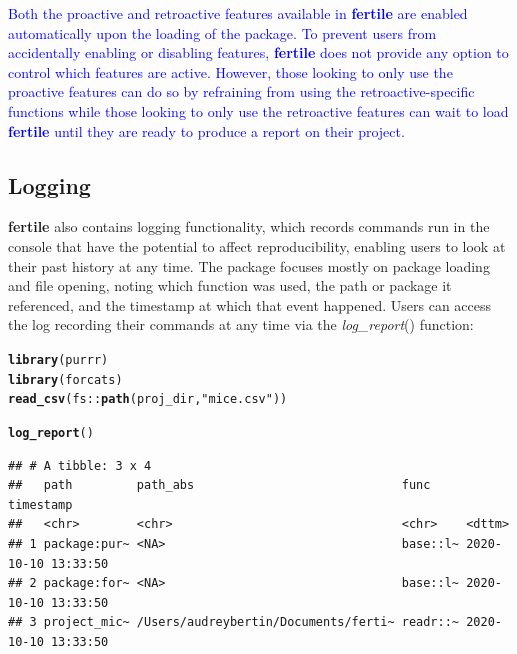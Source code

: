 \documentclass[APA,LATO1COL]{WileyNJD-v2}\usepackage[]{graphicx}\usepackage[]{color}
\makeatletter
\newcommand{\hlstr}[1]{\textcolor[rgb]{0.192,0.494,0.8}{#1}}%
\newcommand{\hlopt}[1]{\textcolor[rgb]{0,0,0}{#1}}%
\newcommand{\hlstd}[1]{\textcolor[rgb]{0.345,0.345,0.345}{#1}}%
\newcommand{\hlkwd}[1]{\textcolor[rgb]{0.737,0.353,0.396}{\textbf{#1}}}%
\newenvironment{kframe}{%
 \def\at@end@of@kframe{}%
 \ifinner\ifhmode%
  \def\at@end@of@kframe{\end{minipage}}%
  \begin{minipage}{\columnwidth}%
 \fi\fi%
 \def\FrameCommand##1{\hskip\@totalleftmargin \hskip-\fboxsep
 \colorbox{shadecolor}{##1}\hskip-\fboxsep
     \hskip-\linewidth \hskip-\@totalleftmargin \hskip\columnwidth}%
 \MakeFramed {\advance\hsize-\width
   \@totalleftmargin\z@ \linewidth\hsize
   \@setminipage}}%
 {\par\unskip\endMakeFramed%
 \at@end@of@kframe}
\newenvironment{knitrout}{}{} %
\newcommand{\pkg}[1]{\textbf{#1}}
\newcommand{\func}[1]{\textit{#1}()}
\makeatother
\begin{document}
\textcolor{blue}{Both the proactive and retroactive features available in \pkg{fertile} are enabled automatically upon the loading of the package. To prevent users from accidentally enabling or disabling features, \pkg{fertile} does not provide any option to control which features are active. However, those looking to only use the proactive features can do so by refraining from using the retroactive-specific functions while those looking to only use the retroactive features can wait to load \pkg{fertile} until they are ready to produce a report on their project.}

\subsection{Logging}

\pkg{fertile} also contains logging functionality, which records commands run in the console that have the potential to affect reproducibility, enabling users to look at their past history at any time. The package focuses mostly on package loading and file opening, noting which function was used, the path or package it referenced, and the timestamp at which that event happened. Users can access the log recording their commands at any time via the \func{log\_report} function:




\begin{knitrout}
\color{fgcolor}\begin{kframe}
\begin{alltt}
\hlkwd{library}\hlstd{(purrr)}
\hlkwd{library}\hlstd{(forcats)}
\hlkwd{read_csv}\hlstd{(fs}\hlopt{::}\hlkwd{path}\hlstd{(proj_dir,} \hlstr{"mice.csv"}\hlstd{))}
\end{alltt}
\end{kframe}
\end{knitrout}

\begin{knitrout}
\color{fgcolor}\begin{kframe}
\begin{alltt}
\hlkwd{log_report}\hlstd{()}
\end{alltt}
\begin{verbatim}
## # A tibble: 3 x 4
##   path         path_abs                             func     timestamp          
##   <chr>        <chr>                                <chr>    <dttm>             
## 1 package:pur~ <NA>                                 base::l~ 2020-10-10 13:33:50
## 2 package:for~ <NA>                                 base::l~ 2020-10-10 13:33:50
## 3 project_mic~ /Users/audreybertin/Documents/ferti~ readr::~ 2020-10-10 13:33:50
\end{verbatim}
\end{kframe}
\end{knitrout}
\end{document}
